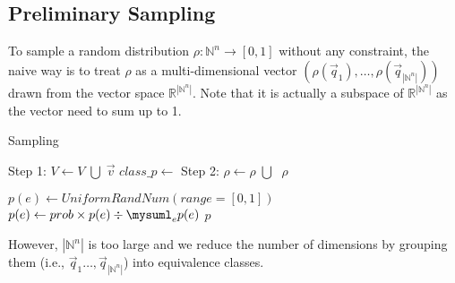 \subsection{Preliminary Sampling}
To sample a random distribution $\rho : \mathbb{N}^n\to[0,1]$ without any constraint, the naive way is to treat $\rho$ as a multi-dimensional vector $(\rho(\vec{q}_1),\ldots,\rho(\vec{q}_{|\mathbb{N}^n|}))$ drawn from the vector space $\mathbb{R}^{|\mathbb{N}^n|}$. Note that it is actually a subspace of $\mathbb{R}^{|\mathbb{N}^n|}$ as the vector need to sum up to 1.
\begin{algorithm}
\caption{Sampling}
\label{alg:sampling}
\begin{algorithmic}[1]
\label{procedure:twostepsampling}
\State Step 1:
\State $V \gets V\; \bigcup \;\vec{v}$
\EndFor
\State $class\_p \gets $
\State Step 2:
\State $\rho \gets \rho\; \bigcup \; $
\EndFor
\State \Return $\rho$
\EndProcedure

\State

\State $p(e) \gets UniformRandNum(range=[0,1])$
\EndFor
{}
\State $p(e) \gets prob\times p(e)\div\mysuml_{e}p(e)$
\EndFor
\State \Return $p$
\EndProcedure
\end{algorithmic}
\end{algorithm}
However, $|\mathbb{N}^n|$ is too large and we reduce the number of dimensions by grouping them (i.e., $\vec{q}_1\ldots,\vec{q}_{|\mathbb{N}^n|}$) into equivalence classes.


